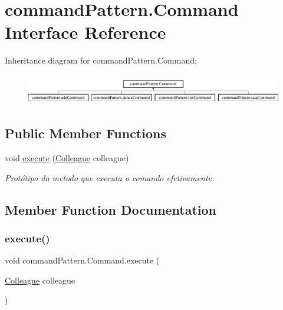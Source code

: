 \hypertarget{interfacecommand_pattern_1_1_command}{}\section{command\+Pattern.\+Command Interface Reference}
\label{interfacecommand_pattern_1_1_command}
Inheritance diagram for command\+Pattern.\+Command\+:\begin{figure}[H]
\begin{center}
\leavevmode
\includegraphics[height=1.359223cm]{interfacecommand_pattern_1_1_command}
\end{center}
\end{figure}
\subsection*{Public Member Functions}
\begin{DoxyCompactItemize}
\item 
void \mbox{\hyperlink{interfacecommand_pattern_1_1_command_a4e6eb0bcffccf0b3934ccd1d5727b39b}{execute}} (\mbox{\hyperlink{classmediator_pattern_1_1_colleague}{Colleague}} colleague)
\begin{DoxyCompactList}\small\item\em Protótipo do metodo que executa o comando efetivamente. \end{DoxyCompactList}\end{DoxyCompactItemize}


\subsection{Member Function Documentation}
\mbox{\label{interfacecommand_pattern_1_1_command_a4e6eb0bcffccf0b3934ccd1d5727b39b}} 
\subsubsection{\texorpdfstring{execute()}{execute()}}
{\footnotesize\ttfamily void command\+Pattern.\+Command.\+execute (\begin{DoxyParamCaption}\item[{\mbox{\hyperlink{classmediator_pattern_1_1_colleague}{Colleague}}}]{colleague }\end{DoxyParamCaption})}



